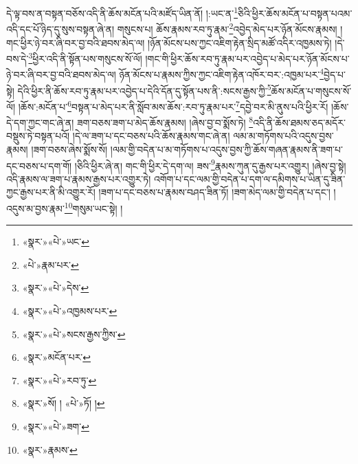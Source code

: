 དེ་ལྟ་བས་ན་བསྟན་བཅོས་འདི་ནི་ཆོས་མངོན་པའི་མཛོད་ཡིན་ནོ། །:ཡང་ན་\footnote{«སྣར་»«པེ་»ཡང་}ཅིའི་ཕྱིར་ཆོས་མངོན་པ་བསྟན་པའམ་འདི་དང་པོ་ཉིད་དུ་སུས་བསྟན་ཞེ་ན། གསུངས་པ། ཆོས་རྣམས་རབ་ཏུ་རྣམ་\footnote{«པེ་»རྣམ་པར་}འབྱེད་མེད་པར་ཉོན་མོངས་རྣམས། །གང་ཕྱིར་ཉེ་བར་ཞི་བར་བྱ་བའི་ཐབས་མེད་ལ། །ཉོན་མོངས་པས་ཀྱང་འཇིག་རྟེན་སྲིད་མཚོ་འདིར་འཁྱམས་ཏེ། །དེ་བས་དེ་\footnote{«སྣར་»«པེ་»དེས་}ཕྱིར་འདི་ནི་སྟོན་པས་གསུངས་སོ་ལོ། །གང་གི་ཕྱིར་ཆོས་རབ་ཏུ་རྣམ་པར་འབྱེད་པ་མེད་པར་ཉོན་མོངས་པ་ཉེ་བར་ཞི་བར་བྱ་བའི་ཐབས་མེད་ལ། ཉོན་མོངས་པ་རྣམས་ཀྱིས་ཀྱང་འཇིག་རྟེན་འཁོར་བར་:འཁྱམ་པར་\footnote{«སྣར་»«པེ་»འཁྱམས་པར་}བྱེད་པ་སྟེ། དེའི་ཕྱིར་ནི་ཆོས་རབ་ཏུ་རྣམ་པར་འབྱེད་པ་དེའི་དོན་དུ་སྟོན་པས་ནི་:སངས་རྒྱས་ཀྱི་\footnote{«སྣར་»«པེ་»སངས་རྒྱས་ཀྱིས་}ཆོས་མངོན་པ་གསུངས་སོ་ལོ། །ཆོས་:མངོན་པ་\footnote{«སྣར་»མངོན་པར་}བསྟན་པ་མེད་པར་ནི་སློབ་མས་ཆོས་:རབ་ཏུ་རྣམ་པར་\footnote{«སྣར་»«པེ་»རབ་ཏུ་}དབྱེ་བར་མི་ནུས་པའི་ཕྱིར་རོ། །ཆོས་དེ་དག་ཀྱང་གང་ཞེ་ན། ཟག་བཅས་ཟག་པ་མེད་ཆོས་རྣམས། །ཞེས་བྱ་བ་སྨོས་ཏེ། \footnote{«སྣར་»སོ། ། «པེ་»ཏོ། ། }འདི་ནི་ཆོས་ཐམས་ཅད་མདོར་བསྡུས་ཏེ་བསྟན་པའོ། །དེ་ལ་ཟག་པ་དང་བཅས་པའི་ཆོས་རྣམས་གང་ཞེ་ན། ལམ་མ་གཏོགས་པའི་འདུས་བྱས་རྣམས། །ཟག་བཅས་ཞེས་སྨོས་སོ། །ལམ་གྱི་བདེན་པ་མ་གཏོགས་པ་འདུས་བྱས་ཀྱི་ཆོས་གཞན་རྣམས་ནི་ཟག་པ་དང་བཅས་པ་དག་གོ། །ཅིའི་ཕྱིར་ཞེ་ན། གང་གི་ཕྱིར་དེ་དག་ལ། ཟས་\footnote{«སྣར་»«པེ་»ཟག་}རྣམས་ཀུན་དུ་རྒྱས་པར་འགྱུར། །ཞེས་བྱ་སྟེ། འདི་རྣམས་ལ་ཟག་པ་རྣམས་རྒྱས་པར་འགྱུར་ཏེ། འགོག་པ་དང་ལམ་གྱི་བདེན་པ་དག་ལ་དམིགས་པ་ཡིན་དུ་ཟིན་ཀྱང་རྒྱས་པར་ནི་མི་འགྱུར་རོ། །ཟག་པ་དང་བཅས་པ་རྣམས་བཤད་ཟིན་ཏོ། །ཟག་མེད་ལམ་གྱི་བདེན་པ་དང་། །འདུས་མ་བྱས་རྣམ་\footnote{«སྣར་»རྣམས་}གསུམ་ཡང་སྟེ། །
